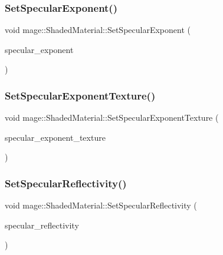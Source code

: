 \subsubsection{\texorpdfstring{Set\+Specular\+Exponent()}{SetSpecularExponent()}}
{\footnotesize\ttfamily void mage\+::\+Shaded\+Material\+::\+Set\+Specular\+Exponent (\begin{DoxyParamCaption}\item[{float}]{specular\+\_\+exponent }\end{DoxyParamCaption})\hspace{0.3cm}{\ttfamily [noexcept]}}

\hypertarget{structmage_1_1_shaded_material_a5ef7c32a67a49814a448667779cfcb4b}{}\label{structmage_1_1_shaded_material_a5ef7c32a67a49814a448667779cfcb4b} 
\subsubsection{\texorpdfstring{Set\+Specular\+Exponent\+Texture()}{SetSpecularExponentTexture()}}
{\footnotesize\ttfamily void mage\+::\+Shaded\+Material\+::\+Set\+Specular\+Exponent\+Texture (\begin{DoxyParamCaption}\item[{\hyperlink{namespacemage_a1e01ae66713838a7a67d30e44c67703e}{Shared\+Ptr}$<$ \hyperlink{classmage_1_1_texture}{Texture} $>$}]{specular\+\_\+exponent\+\_\+texture }\end{DoxyParamCaption})}

\hypertarget{structmage_1_1_shaded_material_aa31a28ef31f98adf3ccf1fa83e6db9fb}{}\label{structmage_1_1_shaded_material_aa31a28ef31f98adf3ccf1fa83e6db9fb} 
\subsubsection{\texorpdfstring{Set\+Specular\+Reflectivity()}{SetSpecularReflectivity()}}
{\footnotesize\ttfamily void mage\+::\+Shaded\+Material\+::\+Set\+Specular\+Reflectivity (\begin{DoxyParamCaption}\item[{const \hyperlink{structmage_1_1_r_g_b_spectrum}{R\+G\+B\+Spectrum} \&}]{specular\+\_\+reflectivity }\end{DoxyParamCaption})\hspace{0.3cm}{\ttfamily [noexcept]}}

